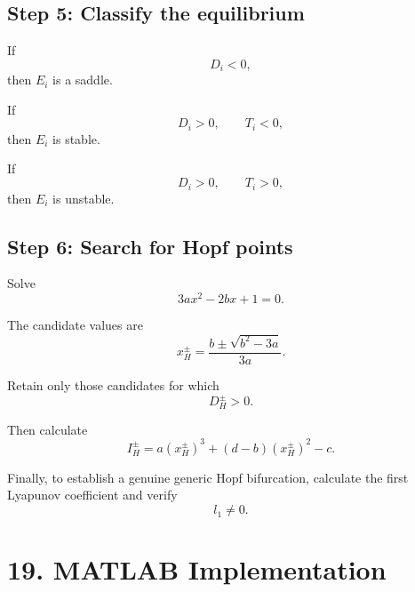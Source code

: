 \documentclass[11pt,a4paper]{article}
\begin{document}
\subsection*{Step 5: Classify the equilibrium}

If
\begin{equation}
D_i<0,
\end{equation}
then $E_i$ is a saddle.

If
\begin{equation}
D_i>0,\qquad T_i<0,
\end{equation}
then $E_i$ is stable.

If
\begin{equation}
D_i>0,\qquad T_i>0,
\end{equation}
then $E_i$ is unstable.

\subsection*{Step 6: Search for Hopf points}

Solve
\begin{equation}
\boxed{
3ax^2-2bx+1=0.
}
\tag{70}
\end{equation}

The candidate values are
\begin{equation}
\boxed{
x_H^\pm
=
\frac{b\pm\sqrt{b^2-3a}}{3a}.
}
\tag{71}
\end{equation}

Retain only those candidates for which
\begin{equation}
\boxed{
D_H^\pm>0.
}
\tag{72}
\end{equation}

Then calculate
\begin{equation}
\boxed{
I_H^\pm
=
a(x_H^\pm)^3
+
(d-b)(x_H^\pm)^2
-c.
}
\tag{73}
\end{equation}

Finally, to establish a genuine generic Hopf bifurcation, calculate
the first Lyapunov coefficient and verify
\begin{equation}
\boxed{
l_1\neq0.
}
\tag{74}
\end{equation}

\section{19. MATLAB Implementation}
\end{document}
